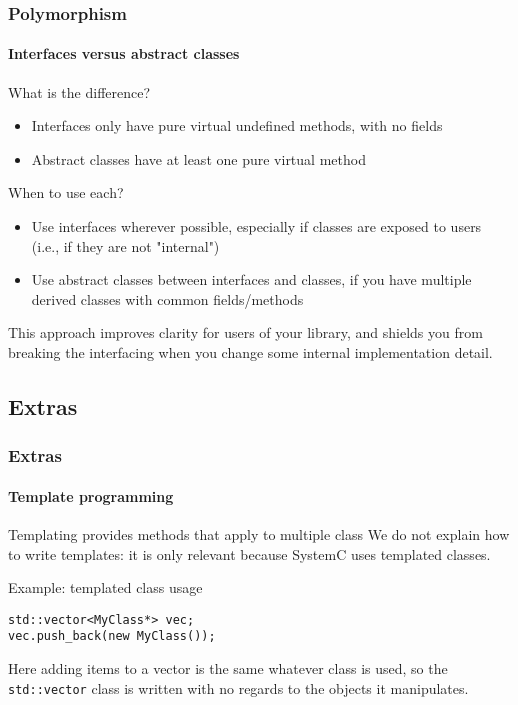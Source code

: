 \begin{frame}
\frametitle{Polymorphism}
\framesubtitle{Interfaces versus abstract classes}

\begin{block}{What is the difference?}
\begin{itemize}
\item Interfaces only have pure virtual undefined methods, with no fields
\item Abstract classes have at least one pure virtual method
\end{itemize}
\end{block}
\pause
\begin{block}{When to use each?}
\begin{itemize}
\item Use interfaces wherever possible, especially if classes are exposed to users (i.e., if they are not "internal")
\item Use abstract classes between interfaces and classes, if you have multiple derived classes with common fields/methods
\end{itemize}
This approach improves clarity for users of your library, and shields you from breaking the interfacing when you change some internal implementation detail.
\end{block}

\end{frame}

\subsection{Extras}

\begin{frame}[fragile]
\frametitle{Extras}
\framesubtitle{Template programming}

\begin{block}{Templating provides methods that apply to multiple class}
We do not explain how to write templates: it is only relevant because SystemC uses templated classes.
\end{block}
\pause
\begin{block}{Example: templated class usage}
\begin{verbatim}
std::vector<MyClass*> vec;
vec.push_back(new MyClass());
\end{verbatim}

Here adding items to a vector is the same whatever class is used, so the \texttt{std::vector} class is written with no regards to the objects it manipulates.
\end{block}

\end{frame}

